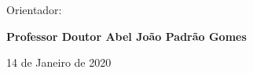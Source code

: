 \vspace{0,5cm}
\begin{center}
\begin{normalsize}
\begin{large}
Orientador:
\end{large}
\end{normalsize}
\end{center}

\vspace{0.2cm}
\begin{center}
\begin{large}
\textbf{Professor Doutor Abel João Padrão Gomes}
\end{large}
\end{center}

\vspace{0.5cm}
\begin{center}
\begin{normalsize}
14 de Janeiro de 2020
\end{normalsize}
\end{center}